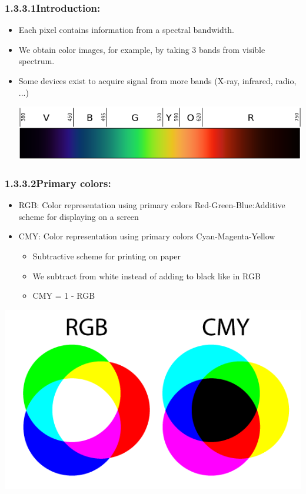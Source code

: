 \subsubsection*{1.3.3.1\hspace{0.5cm}Introduction:}
\begin{itemize}
\item Each pixel contains information from a spectral bandwidth.
\item We obtain color images, for example, by taking 3 bands from visible spectrum.
\item Some devices exist to acquire signal from more bands (X-ray, infrared, radio, ...)
\begin{center}
\includegraphics[width=\textwidth]{color-spectrum.png}
\end{center}
\end{itemize}
\pagebreak
\subsubsection*{1.3.3.2\hspace{0.5cm}Primary colors:}
\begin{itemize}
\item RGB: Color representation using primary colors Red-Green-Blue:Additive scheme for displaying on a screen
\item CMY: Color representation using primary colors Cyan-Magenta-Yellow
\begin{itemize}
\item Subtractive scheme for printing on paper
\item We subtract from white instead of adding to black like in RGB
\item CMY = 1 - RGB
\end{itemize}
\end{itemize}
\begin{center}
\includegraphics[width=\textwidth]{rgbCMY.png}
\end{center}
